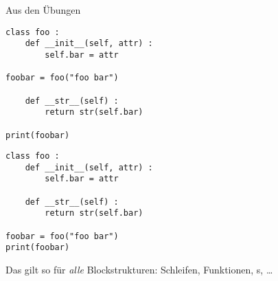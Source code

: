 \begin{frame}[fragile]{Aus den Übungen}
%
\begin{tcbraster}[raster columns=2,
                  raster equal height,
                  nobeforeafter,
                  raster column skip=0.5cm]
\begin{warnbox}[Beispiel: Unterbrochene Blöcke, leftupper=6mm]
\begin{verbatim}
class foo :
    def __init__(self, attr) :
        self.bar = attr

foobar = foo("foo bar")

    def __str__(self) :
        return str(self.bar)

print(foobar)
\end{verbatim}
\end{warnbox}
%
\begin{codebox}
\begin{verbatim}
class foo :
    def __init__(self, attr) :
        self.bar = attr

    def __str__(self) :
        return str(self.bar)

foobar = foo("foo bar")
print(foobar)
\end{verbatim}
\end{codebox}
\end{tcbraster}
%
\begin{hintbox}
Das gilt so für \emph{alle} Blockstrukturen: Schleifen, Funktionen, s, \ldots
\end{hintbox}
%
\end{frame}


